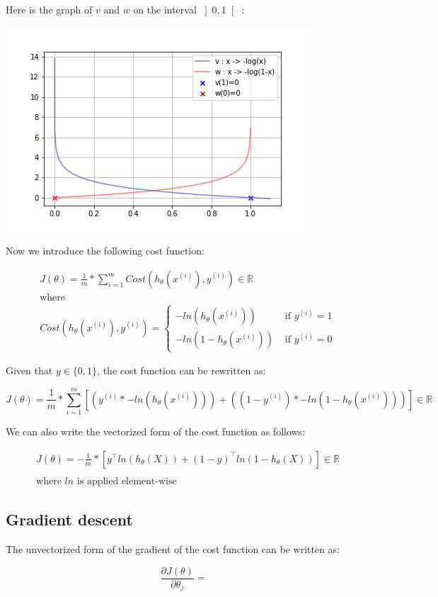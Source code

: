 \documentclass[a4paper, 12pt]{article}
\begin{document}
Here is the graph of $v$ and $w$ on the interval $\left] 0, 1 \right[$ :

\begin{center}
  \includegraphics[scale=0.7]{vw}
  \label{fig:vw}
\end{center}

Now we introduce the following cost function:

\begin{align*}
& J(\theta) = \frac{1}{m} * \sum_{i=1}^{m} Cost\left(h_{\theta}\left(x^{(i)}\right), y^{(i)}\right) \in \mathbb{R} \\
& \text{where} \\
& Cost\left(h_{\theta}\left(x^{(i)}\right), y^{(i)}\right)  =
\begin{cases}
-ln\left(h_{\theta}\left(x^{(i)}\right)\right) & \text{ if } y^{(i)}=1 \\
-ln\left(1-h_{\theta}\left(x^{(i)}\right)\right) & \text{ if } y^{(i)}=0
\end{cases}
\end{align*}

Given that $y \in \{0, 1\}$, the cost function can be rewritten as:

\begin{equation}
J(\theta) = \frac{1}{m} * \sum_{i=1}^{m} \left[  \left(y^{(i)} * -ln\left(h_{\theta}\left(x^{(i)}\right)\right)\right) + \left( (1-y^{(i)}) * -ln\left(1-h_{\theta}\left(x^{(i)}\right)\right)  \right) \right] \in \mathbb{R}
\end{equation}

We can also write the vectorized form of the cost function as follows:

\begin{align*}
& J(\theta) = -\frac{1}{m} * \left[y^{\top} ln(h_{\theta}(X)) + (1-y)^{\top}ln(1-h_{\theta}(X)) \right] \in \mathbb{R} \\
& \\
& \text{where } ln \text{ is applied element-wise} 
\end{align*}

\subsection{Gradient descent}

The unvectorized form of the gradient of the cost function can be written as:

\begin{equation}
\frac{\partial J(\theta)}{\partial \theta_{j}} = 
\end{equation}
\end{document}
